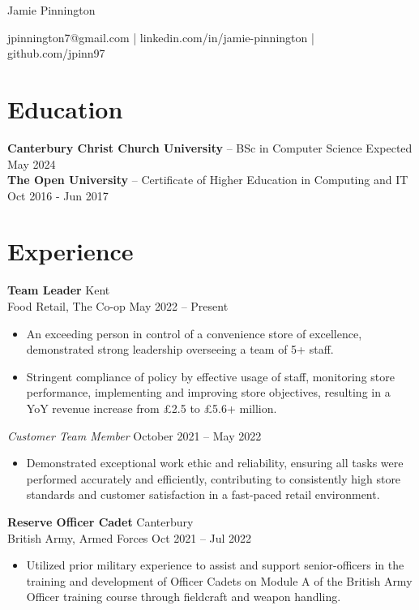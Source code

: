 \documentclass[11pt,letterpaper]{article}
\begin{document}
\centerline{\Huge Jamie Pinnington}
\centerline{jpinnington7@gmail.com | linkedin.com/in/jamie-pinnington | github.com/jpinn97}

\section*{Education}
\textbf{Canterbury Christ Church University} -- BSc in Computer Science \hfill Expected May 2024 \\
\textbf{The Open University} -- Certificate of Higher Education in Computing and IT \hfill Oct 2016 - Jun 2017

\vspace{-4.5pt}

\section*{Experience}
\textbf{Team Leader} \hfill Kent \\
Food Retail, The Co-op \hfill May 2022 -- Present \\
\vspace{-10pt}
\begin{itemize}
  \item An exceeding person in control of a convenience store of excellence, demonstrated strong leadership overseeing a team of 5+ staff.
  \item Stringent compliance of policy by effective usage of staff, monitoring store performance, implementing and improving store objectives, resulting in a YoY revenue increase from £2.5 to £5.6+ million.
\end{itemize}

\textit{Customer Team Member} \hfill October 2021 -- May 2022
\vspace{-10pt}
\begin{itemize}
  \item Demonstrated exceptional work ethic and reliability, ensuring all tasks were performed accurately and efficiently, contributing to consistently high store standards and customer satisfaction in a fast-paced retail environment.
\end{itemize}

\textbf{Reserve Officer Cadet} \hfill Canterbury \\
British Army, Armed Forces \hfill Oct 2021 -- Jul 2022 \\
\vspace{-10pt}
\begin{itemize}
  \item Utilized prior military experience to assist and support senior-officers in the training and development of Officer Cadets on Module A of the British Army Officer training course through fieldcraft and weapon handling.
\end{itemize}
\end{document}
